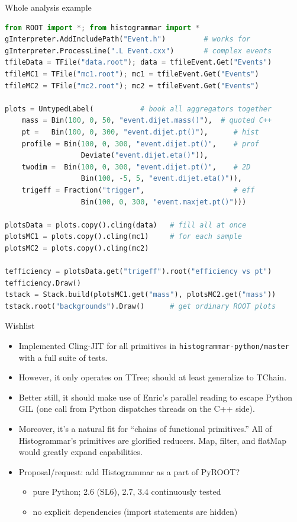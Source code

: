 \documentclass{beamer}
\begin{document}
\begin{frame}[fragile]{Whole analysis example}
\vspace{0.1 cm}
\begin{lstlisting}[language=python]
from ROOT import *; from histogrammar import *             
gInterpreter.AddIncludePath("Event.h")         # works for
gInterpreter.ProcessLine(".L Event.cxx")       # complex events
tfileData = TFile("data.root"); data = tfileEvent.Get("Events")
tfileMC1 = TFile("mc1.root"); mc1 = tfileEvent.Get("Events")
tfileMC2 = TFile("mc2.root"); mc2 = tfileEvent.Get("Events")

plots = UntypedLabel(           # book all aggregators together
    mass = Bin(100, 0, 50, "event.dijet.mass()"),  # quoted C++
    pt =   Bin(100, 0, 300, "event.dijet.pt()"),      # hist
    profile = Bin(100, 0, 300, "event.dijet.pt()",    # prof
                  Deviate("event.dijet.eta()")),
    twodim =  Bin(100, 0, 300, "event.dijet.pt()",    # 2D
                  Bin(100, -5, 5, "event.dijet.eta()")),
    trigeff = Fraction("trigger",                     # eff
                  Bin(100, 0, 300, "event.maxjet.pt()")))

plotsData = plots.copy().cling(data)   # fill all at once
plotsMC1 = plots.copy().cling(mc1)     # for each sample
plotsMC2 = plots.copy().cling(mc2)

tefficiency = plotsData.get("trigeff").root("efficiency vs pt")
tefficiency.Draw()
tstack = Stack.build(plotsMC1.get("mass"), plotsMC2.get("mass"))
tstack.root("backgrounds").Draw()      # get ordinary ROOT plots
\end{lstlisting}
\end{frame}

\begin{frame}{Wishlist}
\setlength{\itemsep}{0.5 cm}
\begin{itemize}
\item Implemented Cling-JIT for all primitives in {\tt\small histogrammar-python/master} with a full suite of tests.
\item However, it only operates on TTree; should at least generalize to TChain.
\item Better still, it should make use of Enric's parallel reading to escape Python GIL (one call from Python dispatches threads on the C++ side).
\item Moreover, it's a natural fit for ``chains of functional primitives.'' All of Histogrammar's primitives are glorified reducers. Map, filter, and flatMap would greatly expand capabilities.
\item Proposal/request: add Histogrammar as a part of PyROOT?
\begin{itemize}
\item pure Python; 2.6 (SL6), 2.7, 3.4 continuously tested
\item no explicit dependencies (import statements are hidden)
\end{itemize}
\end{itemize}
\end{frame}
\end{document}
